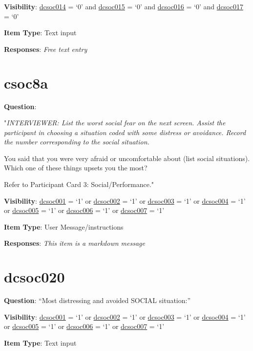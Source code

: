 \documentclass[]{book}
\begin{document}
\textbf{Visibility}: \protect\hyperlink{dcsoc014}{dcsoc014} = `0' and \protect\hyperlink{dcsoc015}{dcsoc015} = `0' and \protect\hyperlink{dcsoc016}{dcsoc016} = `0' and \protect\hyperlink{dcsoc017}{dcsoc017} = `0'

\textbf{Item Type}: Text input

\textbf{Responses}: \emph{Free text entry}

\hypertarget{csoc8a}{%
\section{csoc8a}\label{csoc8a}}

\textbf{Question}:

"\emph{INTERVIEWER: List the worst social fear on the next screen. Assist the participant in choosing a situation coded with some distress or avoidance. Record the number corresponding to the social situation.}

You said that you were very afraid or uncomfortable about (list social situations). Which one of these things upsets you the most?

Refer to Participant Card 3: Social/Performance."

\textbf{Visibility}: \protect\hyperlink{dcsoc001}{dcsoc001} = `1' or \protect\hyperlink{dcsoc002}{dcsoc002} = `1' or \protect\hyperlink{dcsoc003}{dcsoc003} = `1' or \protect\hyperlink{dcsoc004}{dcsoc004} = `1' or \protect\hyperlink{dcsoc005}{dcsoc005} = `1' or \protect\hyperlink{dcsoc006}{dcsoc006} = `1' or \protect\hyperlink{dcsoc007}{dcsoc007} = `1'

\textbf{Item Type}: User Message/instructions

\textbf{Responses}: \emph{This item is a markdown message}

\hypertarget{dcsoc020}{%
\section{dcsoc020}\label{dcsoc020}}

\textbf{Question}: ``Most distressing and avoided SOCIAL situation:''

\textbf{Visibility}: \protect\hyperlink{dcsoc001}{dcsoc001} = `1' or \protect\hyperlink{dcsoc002}{dcsoc002} = `1' or \protect\hyperlink{dcsoc003}{dcsoc003} = `1' or \protect\hyperlink{dcsoc004}{dcsoc004} = `1' or \protect\hyperlink{dcsoc005}{dcsoc005} = `1' or \protect\hyperlink{dcsoc006}{dcsoc006} = `1' or \protect\hyperlink{dcsoc007}{dcsoc007} = `1'

\textbf{Item Type}: Text input
\end{document}
